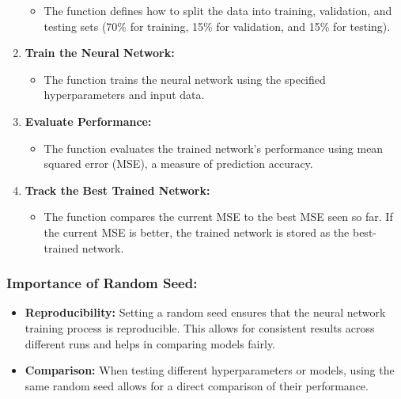 \documentclass[
]{agujournal2019}
\providecommand{\tightlist}{%
  \setlength{\itemsep}{0pt}\setlength{\parskip}{0pt}}\usepackage{longtable,booktabs,array}
\begin{document}
\begin{enumerate}
  \begin{itemize}
  \tightlist
  \item
    The function defines how to split the data into training,
    validation, and testing sets (70\% for training, 15\% for
    validation, and 15\% for testing).
  \end{itemize}
\item
  \textbf{Train the Neural Network:}

  \begin{itemize}
  \tightlist
  \item
    The function trains the neural network using the specified
    hyperparameters and input data.
  \end{itemize}
\item
  \textbf{Evaluate Performance:}

  \begin{itemize}
  \tightlist
  \item
    The function evaluates the trained network's performance using mean
    squared error (MSE), a measure of prediction accuracy.
  \end{itemize}
\item
  \textbf{Track the Best Trained Network:}

  \begin{itemize}
  \tightlist
  \item
    The function compares the current MSE to the best MSE seen so far.
    If the current MSE is better, the trained network is stored as the
    best-trained network.
  \end{itemize}
\end{enumerate}

\subsubsection{Importance of Random
Seed:}\label{importance-of-random-seed-1}

\begin{itemize}
\tightlist
\item
  \textbf{Reproducibility:} Setting a random seed ensures that the
  neural network training process is reproducible. This allows for
  consistent results across different runs and helps in comparing models
  fairly.
\item
  \textbf{Comparison:} When testing different hyperparameters or models,
  using the same random seed allows for a direct comparison of their
  performance.
\end{itemize}
\end{document}
